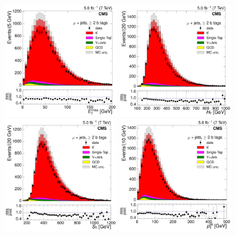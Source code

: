 \begin{figure}[hbtp]
    \centering
     \includegraphics[width=0.45\textwidth]{Chapters/07_08_09_Analysis/Images/control_plots/before_fit/7TeV/MuPlusJets_patType1CorrectedPFMet_2orMoreBtags_with_ratio}\hfill
     \includegraphics[width=0.45\textwidth]{Chapters/07_08_09_Analysis/Images/control_plots/before_fit/7TeV/MuPlusJets_HT_2orMoreBtags_with_ratio}\\
     \includegraphics[width=0.45\textwidth]{Chapters/07_08_09_Analysis/Images/control_plots/before_fit/7TeV/MuPlusJets_patType1CorrectedPFMet_ST_2orMoreBtags_with_ratio}\hfill
     \includegraphics[width=0.45\textwidth]{Chapters/07_08_09_Analysis/Images/control_plots/before_fit/7TeV/MuPlusJets_patType1CorrectedPFMet_WPT_2orMoreBtags_with_ratio}\\

\end{figure}
